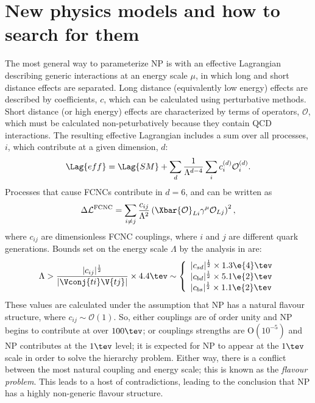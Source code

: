 \section{New physics models and how to search for them}

The most general way to parameterize NP is with an effective Lagrangian describing generic
interactions at an energy scale $\mu$, in which long and short distance effects are separated.
Long distance (equivalently low energy) effects are described by coefficients, $c$, which can be
calculated using perturbative methods.
Short distance (or high energy) effects are characterized by terms of operators, $\mathcal{O}$,
which must be calculated non-peturbatively because they contain QCD interactions.
The resulting effective Lagrangian includes a sum over all processes, $i$, which contribute at a
given dimension, $d$:
\begin{equation}
  \Lag{eff}
  =
  \Lag{SM} + \sum_d\frac1{\Lambda^{d-4}}
  \sum_ic_i^{(d)}\mathcal{O}_i^{(d)}.
  \label{eq:th:lageff}
\end{equation}
Processes that cause FCNCs contribute in $d=6$, and can be written as
\begin{equation}
  \Delta\mathcal{L}^\mathrm{FCNC}
  =
  \sum_{i\neq j}\frac{c_{ij}}{\Lambda^2}
  \left(\Xbar{\mathcal{O}}_{Li}\gamma^\mu\mathcal{O}_{Lj}\right)^2,
\end{equation}
where $c_{ij}$ are dimensionless FCNC couplings, where $i$ and $j$ are different quark generations.
Bounds set on the energy scale $\Lambda$ by the analysis in  are:
\begin{equation}
  \Lambda > \frac{|c_{ij}|^\frac12}{|\Vconj{ti}\V{tj}|}\times4.4\tev
  \sim
  \left\{
    \begin{array}{l}
      |c_{sd}|^\frac12\times 1.3\e{4}\tev \\
      |c_{bd}|^\frac12\times 5.1\e{2}\tev \\
      |c_{bs}|^\frac12\times 1.1\e{2}\tev \\
    \end{array}\right.
\end{equation}
These values are calculated under the assumption that NP has a natural flavour structure, where
$c_{ij}\sim\mathcal{O}(1)$.
So, either couplings are of order unity and NP begins to contribute at over $100\tev$; or couplings
strengths are $\mathrm{O}(10^{-5})$ and NP contributes at the $1\tev$ level;
it is expected for NP to appear at the $1\tev$ scale in order to solve the hierarchy problem.
Either way, there is a conflict between the most natural coupling and energy scale; this is known
as the \emph{flavour problem}.
This leads to a host of contradictions, leading to the conclusion that NP has a highly non-generic
flavour structure.


